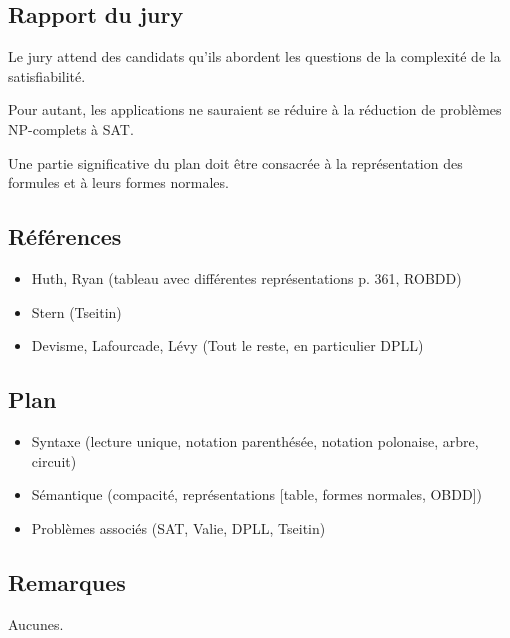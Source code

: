 \documentclass[../../Agregation.tex]{subfiles}
\begin{document}

\subsection{Rapport du jury}

\begin{aquote}{}
Le jury attend des candidats qu'ils abordent les questions de la complexité de la satisfiabilité.

Pour autant, les applications ne sauraient se réduire à la réduction de problèmes NP-complets à SAT.

Une partie significative du plan doit être consacrée à la représentation des formules et à leurs formes normales.
\end{aquote}

\dvts

\subsection{Références}

\begin{itemize}
	\item Huth, Ryan (tableau avec différentes représentations p. 361, ROBDD)
	\item Stern (Tseitin)
	\item Devisme, Lafourcade, Lévy (Tout le reste, en particulier DPLL)
\end{itemize}

\subsection{Plan}

\begin{itemize}
	\item Syntaxe (lecture unique, notation parenthésée, notation polonaise, arbre, circuit)
	\item Sémantique (compacité, représentations [table, formes normales, OBDD])
	\item Problèmes associés (SAT, Valie, DPLL, Tseitin)
\end{itemize}

\subsection{Remarques}

Aucunes.
\end{document}
